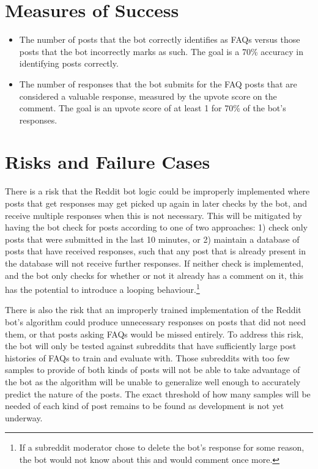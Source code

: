 \documentclass[dvips,11pt]{article}
\begin{document}
\section{Measures of Success}

\begin{itemize}
\item The number of posts that the bot correctly identifies as FAQs versus those posts that the bot incorrectly marks as such. The goal is a 70\% accuracy in identifying posts correctly.
\item The number of responses that the bot submits for the FAQ posts that are considered a valuable response, measured by the upvote score on the comment. The goal is an upvote score of at least 1 for 70\% of the bot's responses.
\end{itemize}

\section{Risks and Failure Cases}

There is a risk that the Reddit bot logic could be improperly implemented where posts that get responses may get picked up again in later checks by the bot, and receive multiple responses when this is not necessary. This will be mitigated by having the bot check for posts according to one of two approaches: 1) check only posts that were submitted in the last 10 minutes, or 2) maintain a database of posts that have received responses, such that any post that is already present in the database will not receive further responses. If neither check is implemented, and the bot only checks for whether or not it already has a comment on it, this has the potential to introduce a looping behaviour.\footnote{If a subreddit moderator chose to delete the bot's response for some reason, the bot would not know about this and would comment once more.}

There is also the risk that an improperly trained implementation of the Reddit bot's algorithm could produce unnecessary responses on posts that did not need them, or that posts asking FAQs would be missed entirely. To address this risk, the bot will only be tested against subreddits that have sufficiently large post histories of FAQs to train and evaluate with. Those subreddits with too few samples to provide of both kinds of posts will not be able to take advantage of the bot as the algorithm will be unable to generalize well enough to accurately predict the nature of the posts. The exact threshold of how many samples will be needed of each kind of post remains to be found as development is not yet underway.
\end{document}
